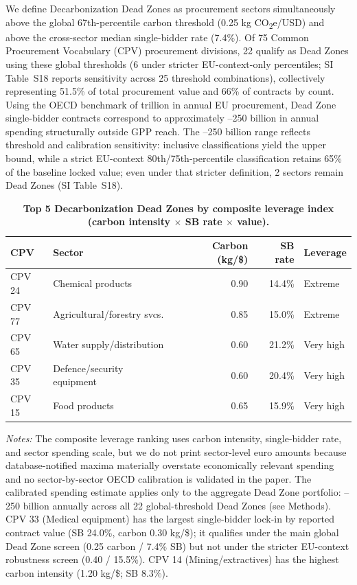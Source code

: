 \documentclass[11pt,a4paper]{article}
\newcommand{\tabnotes}[1]{%
	\par\vspace{0.45em}%
	\begin{minipage}{0.98\linewidth}
	\footnotesize\raggedright\textit{Notes:} #1
	\end{minipage}\par
}
\begin{document}
We define Decarbonization Dead Zones as procurement sectors simultaneously above the global 67th-percentile carbon threshold (0.25 kg CO\textsubscript{2}e/USD) and above the cross-sector median single-bidder rate (7.4\%). Of 75 Common Procurement Vocabulary (CPV) procurement divisions, 22 qualify as Dead Zones using these global thresholds (6 under stricter EU-context-only percentiles; SI Table~S18 reports sensitivity across 25 threshold combinations), collectively representing 51.5\% of total procurement value and 66\% of contracts by count. Using the OECD benchmark of  trillion in annual EU procurement\cite{oecd2023procurement}, Dead Zone single-bidder contracts correspond to approximately --250 billion in annual spending structurally outside GPP reach. The --250 billion range reflects threshold and calibration sensitivity: inclusive classifications yield the upper bound, while a strict EU-context 80th/75th-percentile classification retains 65\% of the baseline locked value; even under that stricter definition, 2 sectors remain Dead Zones (SI Table~S18).

\begin{table}[H]
\centering
\caption{\textbf{Top 5 Decarbonization Dead Zones by composite leverage index (carbon intensity $\times$ SB rate $\times$ value).}}
\label{tab:deadzones}
\small
\begin{tabular}{llrrl}
\toprule
\textbf{CPV} & \textbf{Sector} & \textbf{Carbon (kg/\$)} & \textbf{SB rate} & \textbf{Leverage} \\
\midrule
CPV 24 & Chemical products & 0.90 & 14.4\% & Extreme \\
CPV 77 & Agricultural/forestry svcs. & 0.85 & 15.0\% & Extreme \\
CPV 65 & Water supply/distribution & 0.60 & 21.2\% & Very high \\
CPV 35 & Defence/security equipment & 0.60 & 20.4\% & Very high \\
CPV 15 & Food products & 0.65 & 15.9\% & Very high \\
\bottomrule
\end{tabular}
\tabnotes{The composite leverage ranking uses carbon intensity, single-bidder rate, and sector spending scale, but we do not print sector-level euro amounts because database-notified maxima materially overstate economically relevant spending and no sector-by-sector OECD calibration is validated in the paper. The calibrated spending estimate applies only to the aggregate Dead Zone portfolio: \texteuro190--250 billion annually across all 22 global-threshold Dead Zones (see Methods). CPV 33 (Medical equipment) has the largest single-bidder lock-in by reported contract value (SB 24.0\%, carbon 0.30 kg/\$); it qualifies under the main global Dead Zone screen (0.25 carbon / 7.4\% SB) but not under the stricter EU-context robustness screen (0.40 / 15.5\%). CPV 14 (Mining/extractives) has the highest carbon intensity (1.20 kg/\$; SB 8.3\%).
}
\end{table}
\end{document}
